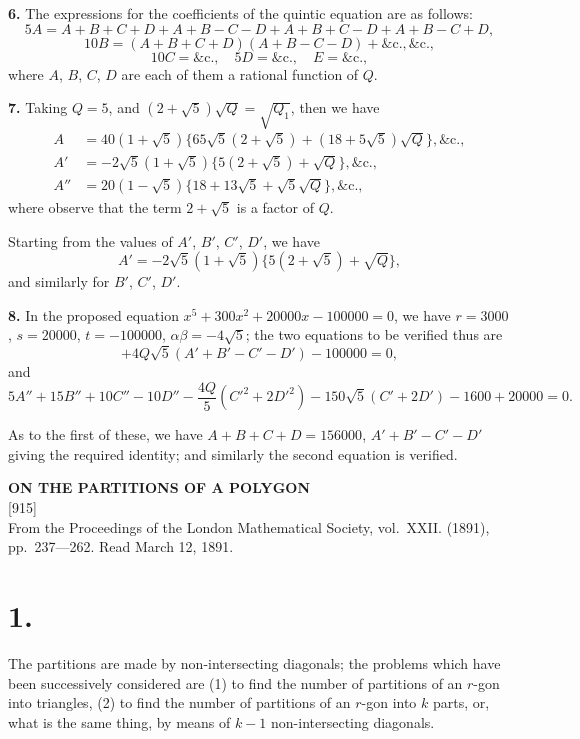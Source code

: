\documentclass[11pt,a4paper]{article}
\newcommand{\paper}[4]{%
  \newpage
  \begin{center}
    {\large\bfseries #2}\\[0.5em]
    {\small [#1]}\\[0.3em]
    {\small #3}
  \end{center}
  \vspace{0.5em}
}
\begin{document}
\vspace{0.5em}
\textbf{6.} The expressions for the coefficients of the quintic equation are as follows:
\[
5A = A + B + C + D + A + B - C - D + A + B + C - D + A + B - C + D,
\]
\[
10B = (A+B+C+D)(A+B-C-D) + \&\text{c.}, \&\text{c.},
\]
\[
10C = \&\text{c.}, \quad 5D = \&\text{c.}, \quad E = \&\text{c.},
\]
where $A$, $B$, $C$, $D$ are each of them a rational function of $Q$.

\vspace{0.5em}
\textbf{7.} Taking $Q = 5$, and $(2 + \sqrt{5})\sqrt{Q} = \sqrt{Q_1}$, then we have
\begin{align*}
A &= 40(1 + \sqrt{5})\{65\sqrt{5}(2 + \sqrt{5}) + (18 + 5\sqrt{5})\sqrt{Q}\}, \&\text{c.}, \\
A' &= -2\sqrt{5}(1 + \sqrt{5})\{5(2 + \sqrt{5}) + \sqrt{Q}\}, \&\text{c.}, \\
A'' &= 20(1 - \sqrt{5})\{18 + 13\sqrt{5} + \sqrt{5}\sqrt{Q}\}, \&\text{c.},
\end{align*}
where observe that the term $2 + \sqrt{5}$ is a factor of $Q$.

Starting from the values of $A'$, $B'$, $C'$, $D'$, we have
\[
A' = -2\sqrt{5}(1 + \sqrt{5})\{5(2 + \sqrt{5}) + \sqrt{Q}\},
\]
and similarly for $B'$, $C'$, $D'$.

\vspace{0.5em}
\textbf{8.} In the proposed equation $x^5 + 300x^2 + 20000x - 100000 = 0$, we have $r = 3000$, $s = 20000$, $t = -100000$, $\alpha\beta = -4\sqrt{5}$; the two equations to be verified thus are
\[
+ 4Q\sqrt{5}(A' + B' - C' - D') - 100000 = 0,
\]
and
\[
5A'' + 15B'' + 10C'' - 10D'' - \frac{4Q}{5}(C'^2 + 2D'^2) - 150\sqrt{5}(C' + 2D') - 1600 + 20000 = 0.
\]

As to the first of these, we have $A + B + C + D = 156000$, $A' + B' - C' - D'$ giving the required identity; and similarly the second equation is verified.

\newpage
\paper{915}{ON THE PARTITIONS OF A POLYGON}{From the Proceedings of the London Mathematical Society, vol.~XXII. (1891), pp.~237---262. Read March 12, 1891.}{}

\section*{1.}
The partitions are made by non-intersecting diagonals; the problems which have been successively considered are (1) to find the number of partitions of an $r$-gon into triangles, (2) to find the number of partitions of an $r$-gon into $k$ parts, or, what is the same thing, by means of $k - 1$ non-intersecting diagonals.
\end{document}
